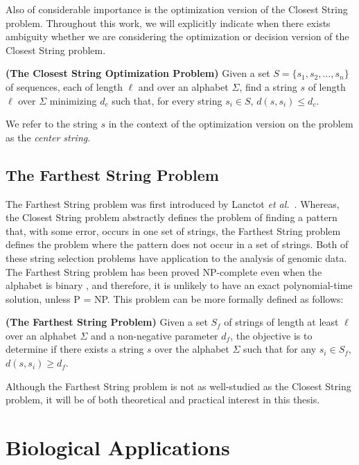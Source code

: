Also of considerable importance is the optimization version of the {\sc Closest String} problem.  Throughout this work, we will explicitly indicate when there exists ambiguity whether we are considering the optimization or decision version of the {\sc Closest String} problem. 

\begin{definition} {\bf (The Closest String Optimization Problem)} Given a set $S = \{s_1, s_2, \ldots, s_n\}$ of sequences, each of length $\ell$ and over an alphabet $\Sigma$, find a string $s$ of length $\ell$ over $\Sigma$ minimizing $d_c$ such that, for every string $s_i \in S$, $d(s, s_i) \leq d_c$. \end{definition}

We refer to the string $s$ in the context of the optimization version on the problem as the {\em center string}. 

\subsection{The {\sc Farthest String} Problem}

The {\sc Farthest String} problem was first introduced by Lanctot {\em et al.}\ \cite{LLMWZ00_v1}.  Whereas, the {\sc Closest String} problem abstractly defines the problem of finding a pattern that, with some error, occurs in one set of strings, the {\sc Farthest String} problem defines the problem where the pattern does not occur in a set of strings. Both of these string selection problems have application to the analysis of genomic data. The {\sc Farthest String} problem has been proved NP-complete even when the alphabet is binary  \cite{LLMWZ00_v1}, and therefore, it is unlikely to have an exact polynomial-time solution, unless P = NP. This problem can be more formally defined as follows: 

\begin{definition} {\bf (The Farthest String Problem) } Given a set $S_f$ of strings of length at least $\ell$ over an alphabet $\Sigma$ and a non-negative parameter $d_f$, the objective is to determine if there exists a string $s$ over the alphabet $\Sigma$  such that for any $s_i \in S_f$, $d(s, s_i) \geq d_f$.  \end{definition} 

Although the {\sc Farthest String} problem is not as well-studied as the {\sc Closest String} problem, it will be of both theoretical and practical interest in this thesis. 

\section{Biological Applications}

